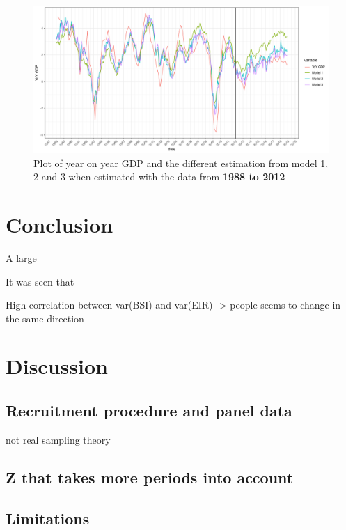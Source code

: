 \documentclass[12pt,a4paper,oneside]{book}
\begin{document}
\begin{figure}[H]
    \centering
    \includegraphics[scale=0.5]{Graphs/predictions3.pdf}
    \caption{Plot of year on year GDP and the different estimation from model 1, 2 and 3 when estimated with the data from \textbf{1988 to 2012}}
    \label{fig:predictions1}
\end{figure}













\chapter{Conclusion}

A large 

It was seen that


High correlation between var(BSI) and var(EIR) -> people seems to change in the same direction


\chapter{Discussion}

\section*{Recruitment procedure and panel data}
not real sampling theory



\section*{Z that takes more periods into account}



\section*{Limitations}
\end{document}
